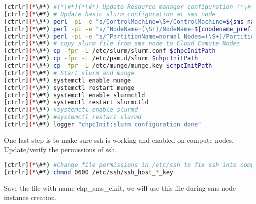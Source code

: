 \begin{lstlisting}[language=bash,keywords={}]
[ctrlr](*\#*) #(*\#*)(*\#*) Update Resource manager configuration (*\#*)(*\#*)(*\#*)
[ctrlr](*\#*) # Update basic slurm configuration at sms node
[ctrlr](*\#*) perl -pi -e "s/ControlMachine=\S+/ControlMachine=${sms_name}/" /etc/slurm/slurm.conf
[ctrlr](*\#*) perl -pi -e "s/^NodeName=(\S+)/NodeName=${cnodename_prefix}[1-${num_ccomputes}]/" /etc/slurm/slurm.conf
[ctrlr](*\#*) perl -pi -e "s/^PartitionName=normal Nodes=(\S+)/PartitionName=normal Nodes=${cnodename_prefix}[1-${num_ccomputes}]/" /etc/slurm/slurm.conf
[ctrlr](*\#*) # copy slurm file from sms node to Cloud Comute Nodes
[ctrlr](*\#*) cp -fpr -L /etc/slurm/slurm.conf $chpcInitPath
[ctrlr](*\#*) cp -fpr -L /etc/pam.d/slurm $chpcInitPath
[ctrlr](*\#*) cp -fpr -L /etc/munge/munge.key $chpcInitPath
[ctrlr](*\#*) # Start slurm and munge 
[ctrlr](*\#*) systemctl enable munge
[ctrlr](*\#*) systemctl restart munge
[ctrlr](*\#*) systemctl enable slurmctld
[ctrlr](*\#*) systemctl restart slurmctld
[ctrlr](*\#*) #systemctl enable slurmd
[ctrlr](*\#*) #systemctl restart slurmd
[ctrlr](*\#*) logger "chpcInit:slurm configuration done"
\end{lstlisting} 


	One last step is to make sure ssh is working and enabled on compute nodes. Update/verify the permissions of ssh.


\begin{lstlisting}[language=bash,keywords={}]
[ctrlr](*\#*) #Change file permissions in /etc/ssh to fix ssh into compute node
[ctrlr](*\#*) chmod 0600 /etc/ssh/ssh_host_*_key
\end{lstlisting} 

	Save the file with name chp\_sms\_cinit, we will use this file during sms node instance creation.

